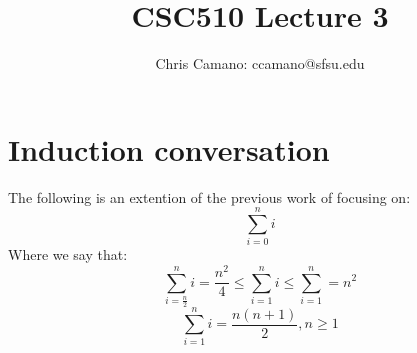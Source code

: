 \documentclass[12pt]{article}
\author{Chris Camano: ccamano@sfsu.edu}
\title{CSC510  Lecture 3 }
\date
\newcommand{\sect}[1]{\section*{#1}}
\theoremstyle{definition}
\theoremstyle{remark}
\numberwithin{equation}{section}
\begin{document}
\maketitle
\sect{Induction conversation}
The following is an extention of the previous work of focusing on:
\[
  \sum_{i=0}^ni
\]
Where we say that:
\[
    \sum_{i=\frac{n}{2}}^ni=\frac{n^2}{4}\leq  \sum_{i=1}^ni\leq\sum_{i=1}^n=n^2
\]
\[
  \sum_{i=1}^ni=\frac{n(n+1)}{2}, n\geq 1
\]
\end{document}
